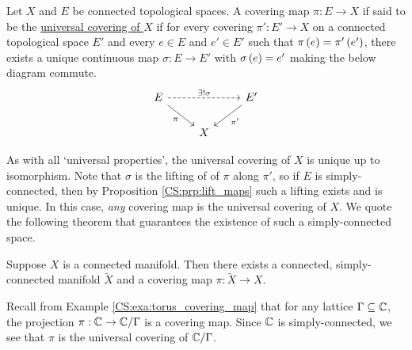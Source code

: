 \documentclass[../Moduli_Spaces_of_Riemann_Surfaces.tex]{subfiles}
\begin{document}
    \begin{definition}
        Let $X$ and $E$ be connected topological spaces. A covering map $\pi:E\to X$ if said to be the \ul{universal covering of $X$} if for every covering $\pi':E'\to X$ on a connected topological space $E'$ and every $e\in E$ and $e'\in E'$ such that $\pi\left(e\right)=\pi'\left(e'\right)$, there exists a unique continuous map $\sigma:E\to E'$ with $\sigma\left(e\right)=e'$ making the below diagram commute.
        \begin{equation*}
            \begin{tikzcd}
                E \ar[rr, "\ex!\sigma", dashed] \ar[dr, "\pi"'] & & E' \ar[dl, "\pi'"] \\
                                                    & X
            \end{tikzcd}
        \end{equation*}
    \end{definition}
    \begin{remark}
        As with all `universal properties', the universal covering of $X$ is unique up to isomorphism. Note that $\sigma$ is the lifting of of $\pi$ along $\pi'$, so if $E$ is simply-connected, then by Proposition \ref{CS:prp:lift_maps} such a lifting exists and is unique. In this case, \textit{any} covering map is the universal covering of $X$. We quote the following theorem that guarantees the existence of such a simply-connected space.\exqed
    \end{remark}
    \begin{theorem}
        Suppose $X$ is a connected manifold. Then there exists a connected, simply-connected manifold $\widetilde{X}$ and a covering map $\pi:\widetilde{X}\to X$.
    \end{theorem}
    \begin{example}
        Recall from Example \ref{CS:exa:torus_covering_map} that for any lattice $\Gamma\subseteq\mathbb{C}$, the projection $\pi:\mathbb{C}\to\mathbb{C}/\Gamma$ is a covering map. Since $\mathbb{C}$ is simply-connected, we see that $\pi$ is the universal covering of $\mathbb{C}/\Gamma$.\exqed
    \end{example}
\end{document}
